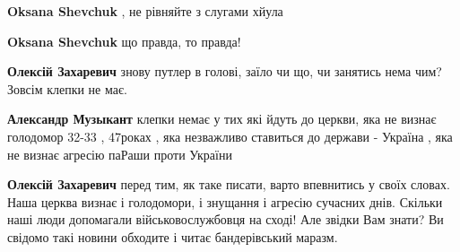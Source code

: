 \begin{itemize}
\begin{itemize}
\begin{itemize}
 
\textbf{Oksana Shevchuk} , не рівняйте з слугами хйула

 
\textbf{Oksana Shevchuk} що правда, то правда!
\end{itemize}

 
\textbf{Олексій Захаревич} знову путлер в голові, заїло чи що, чи занятись нема
чим? Зовсім клепки не має.

\begin{itemize}
 
\textbf{Александр Музыкант} клепки немає у тих які йдуть до церкви, яка не
визнає голодомор 32-33 , 47роках , яка незважливо ставиться до держави -
Україна , яка не визнає агресію паРаши проти України

 
\textbf{Олексій Захаревич} перед тим, як таке писати, варто впевнитись у своїх
словах. Наша церква визнає і голодомори, і знущання і агресію сучасних днів.
Скільки наші люди допомагали військовослужбовця на сході! Але звідки Вам знати?
Ви свідомо такі новини обходите і читає бандерівський маразм.
\end{itemize}


\end{itemize}
\end{itemize}
